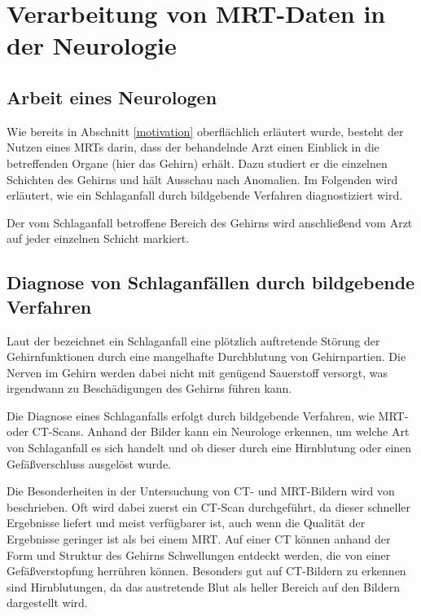 \section{Verarbeitung von MRT-Daten in der Neurologie}						 %

\subsection{Arbeit eines Neurologen}
Wie bereits in Abschnitt \ref{motivation} oberflächlich erläutert wurde, besteht der Nutzen eines MRTs darin, dass der behandelnde Arzt einen Einblick in die betreffenden Organe (hier das Gehirn) erhält. Dazu studiert er die einzelnen Schichten des Gehirns und hält Ausschau nach Anomalien.
Im Folgenden wird erläutert, wie ein Schlaganfall durch bildgebende Verfahren diagnostiziert wird.

Der vom Schlaganfall betroffene Bereich des Gehirns wird anschließend vom Arzt auf jeder einzelnen Schicht markiert.
 
\subsection{Diagnose von Schlaganf\"allen durch bildgebende Verfahren}
\label{schalganfaelleMRT}

Laut der \cite{schlaganfall} bezeichnet ein Schlaganfall eine plötzlich auftretende Störung der Gehirnfunktionen durch eine mangelhafte Durchblutung von Gehirnpartien. Die Nerven im Gehirn werden dabei nicht mit genügend Sauerstoff versorgt, was irgendwann zu Beschädigungen des Gehirns führen kann.

Die Diagnose eines Schlaganfalls erfolgt durch bildgebende Verfahren, wie MRT- oder CT-Scans. Anhand der Bilder kann ein Neurologe erkennen, um welche Art von Schlaganfall es sich handelt und ob dieser durch eine Hirnblutung oder einen Gefäßverschluss ausgelöst wurde. 

Die Besonderheiten in der Untersuchung von CT- und MRT-Bildern wird von \cite{schlaganfallBilder} beschrieben.
Oft wird dabei zuerst ein CT-Scan durchgeführt, da dieser schneller Ergebnisse liefert und meist verfügbarer ist, auch wenn die Qualität der Ergebnisse geringer ist als bei einem MRT. 
Auf einer CT können anhand der Form und Struktur des Gehirns Schwellungen entdeckt werden, die von einer Gefäßverstopfung herrühren können. Besonders gut auf CT-Bildern zu erkennen sind Hirnblutungen, da das austretende Blut als heller Bereich auf den Bildern dargestellt wird. 

